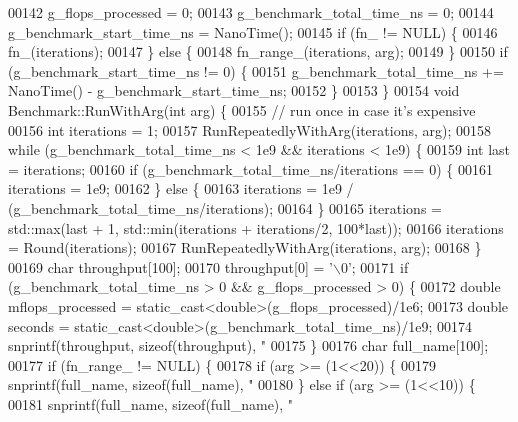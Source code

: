 \begin{DoxyCode}
{{{00142   g\_flops\_processed = 0;
00143   g\_benchmark\_total\_time\_ns = 0;
00144   g\_benchmark\_start\_time\_ns = NanoTime();
00145   \textcolor{keywordflow}{if} (fn\_ != NULL) \{
00146     fn\_(iterations);
00147   \} \textcolor{keywordflow}{else} \{
00148     fn\_range\_(iterations, arg);
00149   \}
00150   \textcolor{keywordflow}{if} (g\_benchmark\_start\_time\_ns != 0) \{
00151     g\_benchmark\_total\_time\_ns += NanoTime() - g\_benchmark\_start\_time\_ns;
00152   \}
00153 \}
00154 \textcolor{keywordtype}{void} Benchmark::RunWithArg(\textcolor{keywordtype}{int} arg) \{
00155   \textcolor{comment}{// run once in case it's expensive}
00156   \textcolor{keywordtype}{int} iterations = 1;
00157   RunRepeatedlyWithArg(iterations, arg);
00158   \textcolor{keywordflow}{while} (g\_benchmark\_total\_time\_ns < 1e9 && iterations < 1e9) \{
00159     \textcolor{keywordtype}{int} last = iterations;
00160     \textcolor{keywordflow}{if} (g\_benchmark\_total\_time\_ns/iterations == 0) \{
00161       iterations = 1e9;
00162     \} \textcolor{keywordflow}{else} \{
00163       iterations = 1e9 / (g\_benchmark\_total\_time\_ns/iterations);
00164     \}
00165     iterations = std::max(last + 1, std::min(iterations + iterations/2, 100*last));
00166     iterations = Round(iterations);
00167     RunRepeatedlyWithArg(iterations, arg);
00168   \}
00169   \textcolor{keywordtype}{char} throughput[100];
00170   throughput[0] = \textcolor{charliteral}{'\(\backslash\)0'};
00171   \textcolor{keywordflow}{if} (g\_benchmark\_total\_time\_ns > 0 && g\_flops\_processed > 0) \{
00172     \textcolor{keywordtype}{double} mflops\_processed = \textcolor{keyword}{static\_cast<}\textcolor{keywordtype}{double}\textcolor{keyword}{>}(g\_flops\_processed)/1e6;
00173     \textcolor{keywordtype}{double} seconds = \textcolor{keyword}{static\_cast<}\textcolor{keywordtype}{double}\textcolor{keyword}{>}(g\_benchmark\_total\_time\_ns)/1e9;
00174     snprintf(throughput, \textcolor{keyword}{sizeof}(throughput), \textcolor{stringliteral}{" %
00175   \}
00176   \textcolor{keywordtype}{char} full\_name[100];
00177   \textcolor{keywordflow}{if} (fn\_range\_ != NULL) \{
00178     \textcolor{keywordflow}{if} (arg >= (1<<20)) \{
00179       snprintf(full\_name, \textcolor{keyword}{sizeof}(full\_name), \textcolor{stringliteral}{"%
00180     \} \textcolor{keywordflow}{else} \textcolor{keywordflow}{if} (arg >= (1<<10)) \{
00181       snprintf(full\_name, \textcolor{keyword}{sizeof}(full\_name), \textcolor{stringliteral}{"%
}}}}}}
\end{DoxyCode}
